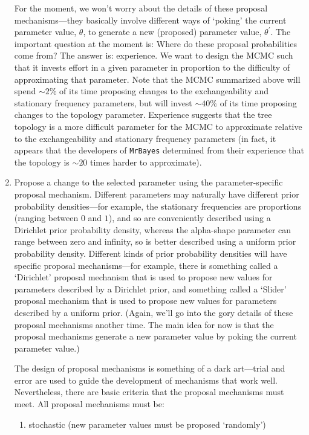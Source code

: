 \begin{enumerate}
{For the moment, we won't worry about the details of these proposal mechanisms---they basically involve different ways of `poking' the current parameter value, $\theta$, to generate a new (proposed) parameter value, $\theta ^{\prime}$. 
The important question at the moment is: Where do these proposal probabilities come from? 
The answer is: experience. 
We want to design the MCMC such that it invests effort in a given parameter in proportion to the difficulty of approximating that parameter. 
Note that the MCMC summarized above will spend $\sim 2\%$ of its time proposing changes to the exchangeability and stationary frequency parameters, but will invest $\sim 40\%$ of its time proposing changes to the topology parameter. 
Experience suggests that the tree topology is a more difficult parameter for the MCMC to approximate relative to the exchangeability and stationary frequency parameters (in fact, it appears that the developers of \verb!MrBayes! determined from their experience that the topology is $\sim 20$ times harder to approximate).}

\item{Propose a change to the selected parameter using the parameter-specific proposal
mechanism. 
Different parameters may naturally have different prior probability densities---for example, the stationary frequencies are proportions (ranging between $0$ and $1$), and so are conveniently described using a Dirichlet prior probability density, whereas the alpha-shape parameter can range between zero and infinity, so is better described using a uniform prior probability density. 
Different kinds of prior probability densities will have specific proposal mechanisms---for example, there is something called a `Dirichlet' proposal mechanism that is used to propose new values for parameters described by a Dirichlet prior, and something called a `Slider' proposal mechanism that is used to propose new values for parameters described by a uniform prior. 
(Again, we'll go into the gory details of these proposal mechanisms another time. 
The main idea for now is that the proposal mechanisms generate a new parameter value by poking the current parameter value.)

The design of proposal mechanisms is something of a dark art---trial and error are used to guide the development of mechanisms that work well. 
Nevertheless, there are basic criteria that the proposal mechanisms must meet. 
All proposal mechanisms must be:

\begin{enumerate}
\item{stochastic (new parameter values must be proposed `randomly')}


\end{enumerate}}
\end{enumerate}
